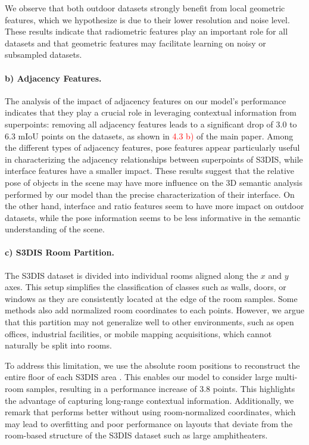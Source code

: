 We observe that both outdoor datasets strongly benefit from local geometric features, which we hypothesize is due to their lower resolution and noise level.
These results indicate that radiometric features play an important role for all datasets and that geometric features may facilitate learning on noisy or subsampled datasets.




\paragraph{b) Adjacency Features.} The analysis of the impact of adjacency features on our model's performance indicates that they play a crucial role in leveraging contextual information from superpoints: removing all adjacency features leads to a significant drop of 
$3.0$ to $6.3$ mIoU points on the datasets, as shown in \textcolor{red}{4.3 b)} of the main paper. 
Among the different types of adjacency features, 
pose features appear particularly useful in characterizing the adjacency relationships between superpoints of S3DIS, while interface features have a smaller impact.
These results suggest that the relative pose 
of objects in the scene may have more influence on the 3D semantic analysis performed by our model than the precise characterization of their interface.
On the other hand, interface and ratio features seem to have more impact on outdoor datasets, while the pose information seems to be less informative in the semantic understanding of the scene.

\paragraph{c)  S3DIS Room Partition.} The S3DIS dataset is divided into individual rooms aligned along the $x$ and $y$ axes.
This setup simplifies the classification of classes such as walls, doors, or windows as they are consistently located at the edge of the room samples. Some methods also add normalized room coordinates to each points.
However, we argue that this partition may not generalize well to other environments, such as open offices, industrial facilities, or mobile mapping acquisitions, which cannot naturally be split into rooms.

To address this limitation, we use the absolute room positions to reconstruct the entire floor of each S3DIS area \cite{thomas2019kpconv,chaton2020torch}. This enables our model to consider large multi-room samples, resulting in a performance increase of $3.8$ points. This highlights the advantage of capturing long-range contextual information.
Additionally, we remark that \SHORTHAND performs better without using room-normalized coordinates, which may lead to overfitting and poor performance on layouts that deviate from the room-based structure of the S3DIS dataset such as large amphitheaters.




